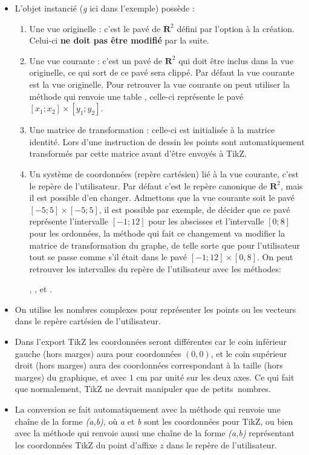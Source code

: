 \begin{itemize}
\item L'objet instancié (\emph{g} ici dans l'exemple) possède :
    \begin{enumerate}
        \item Une vue originelle : c'est le pavé de $\mathbf R^2$ défini par l'option  à la création. Celui-ci \textbf{ne doit pas être modifié} par la suite.
        
        \item Une vue courante : c'est un pavé de $\mathbf R^2$ qui doit être inclus dans la vue originelle, ce qui sort de ce pavé sera clippé. Par défaut la vue courante est la vue originelle. Pour retrouver la vue courante on peut utiliser la méthode  qui renvoie une table , celle-ci représente le pavé $[x_1;x_2]\times [y_1;y_2]$.
        
        \item Une matrice de transformation : celle-ci est initialisée à la matrice identité. Lors d'une instruction de dessin les points sont automatiquement transformés par cette matrice avant d'être envoyés à TikZ.
        
        \item Un système de coordonnées (repère cartésien) lié à la vue courante, c'est le repère de l'utilisateur. Par défaut c'est le repère canonique de $\mathbf R^2$, mais il est possible d'en changer. Admettons que la vue courante soit le pavé $[-5;5]\times[-5;5]$, il est possible par exemple, de décider que ce pavé représente l'intervalle $[-1;12]$ pour les abscisses et l'intervalle $[0;8]$ pour les ordonnées, la méthode qui fait ce changement va modifier la matrice de transformation du graphe, de telle sorte que pour l'utilisateur tout se passe comme s'il était dans le pavé $[-1;12]\times [0,8]$. On peut retrouver les intervalles du repère de l'utilisateur avec les méthodes:\par
        \hfil{}, ,  et .\hfil
    \end{enumerate}
\item On utilise les nombres complexes pour représenter les points ou les vecteurs dans le repère cartésien de l'utilisateur.

\item Dans l'export TikZ les coordonnées seront différentes car le coin inférieur gauche (hors marges) aura pour coordonnées $(0,0)$, et le coin supérieur droit (hors marges) aura des coordonnées correspondant à la taille (hors marges) du graphique, et avec $1$ cm par unité sur les deux axes. Ce qui fait que normalement, TikZ ne devrait manipuler que de \og petits\fg\ nombres.

\item La conversion se fait automatiquement avec la méthode  qui renvoie une chaîne de la forme \emph{(a,b)}, où \emph{a} et \emph{b} sont les coordonnées pour TikZ, ou bien avec la méthode  qui renvoie aussi une chaîne de la forme \emph{(a,b)} représentant les coordonnées TikZ du point d'affixe $z$ dans le repère de l'utilisateur.
\end{itemize}

